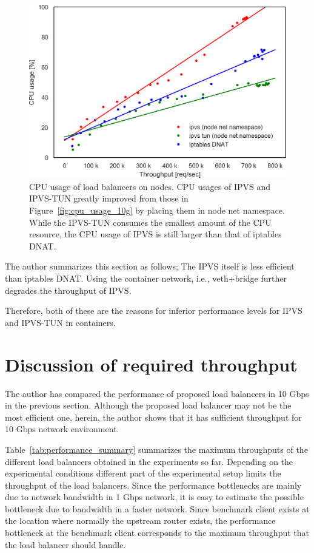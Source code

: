 \begin{figure}[h]
  \centering
  \includegraphics[width=0.8\columnwidth]{Figs/cpu_usage_10g_node_ns}
  \par\bigskip
  \centering
  \begin{minipage}{0.9\columnwidth}
    \caption[CPU usage of load balancers on nodes]{
      CPU usage of load balancers on nodes.
      CPU usages of IPVS and IPVS-TUN greatly improved from those in Figure~\ref{fig:cpu_usage_10g} by placing them in node net namespace.  
      While the IPVS-TUN consumes the smallest amount of the CPU resource, the CPU usage of IPVS is still larger than that of iptables DNAT.
    }
    \label{fig:cpu_usage_10g_node_ns}
  \end{minipage}
\end{figure}

The author summarizes this section as follows;
The IPVS itself is less efficient than iptables DNAT.
Using the container network, i.e., veth+bridge further degrades the throughput of IPVS.

  Therefore, both of these are the reasons for inferior performance levels for IPVS and IPVS-TUN in containers.


\FloatBarrier

\section{Discussion of required throughput}

The author has compared the performance of proposed load balancers in 10 Gbps in the previous section.
Although the proposed load balancer may not be the most efficient one, herein, the author shows that it has sufficient throughput for 10 Gbps network environment.

Table~\ref{tab:performance_summary} summarizes the maximum throughputs of the different load balancers obtained in the experiments so far.
Depending on the experimental conditions different part of the experimental setup limits the throughput of the load balancers.
Since the performance bottlenecks are mainly due to network bandwidth in 1 Gbps network, it is easy to estimate the possible bottleneck due to bandwidth in a faster network.
Since benchmark client exists at the location where normally the upstream router exists, the performance bottleneck at the benchmark client corresponds to the maximum throughput that the load balancer should handle.

